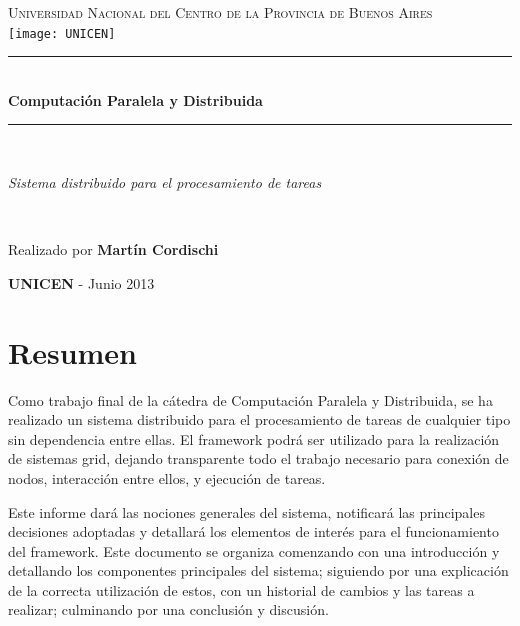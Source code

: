 \documentclass[12pt,a4paper,oneside,spanish]{report}
\newcommand{\HRule}{\rule{\linewidth}{0.5mm}}
\begin{document}
\begin{titlepage}
\begin{center}



\textsc{\LARGE Universidad Nacional del Centro de la Provincia de Buenos Aires}\\[1.5cm]

\texttt{[image: UNICEN]}~\\[1cm]

\HRule \\[0.4cm]
{ \huge \bfseries Computación Paralela y Distribuida}\\[0.4cm]

\HRule \\[0.4cm]


\begin{center}
\textit{Sistema distribuido para el procesamiento de tareas}
\end{center}
~\\[1.5cm]

\begin{center}
Realizado por \textbf{Martín Cordischi}
\end{center}


\textit{} \textbf{} 

\vfill

{\large \textbf{UNICEN} - Junio 2013}

\end{center}
\end{titlepage}

\chapter*{Resumen}

Como trabajo final de la cátedra de Computación Paralela y Distribuida, se ha realizado un sistema distribuido para el procesamiento de tareas de cualquier tipo sin dependencia entre ellas. El framework podrá ser utilizado para la realización de sistemas grid, dejando transparente todo el trabajo necesario para conexión de nodos, interacción entre ellos, y ejecución de tareas.

Este informe dará las nociones generales del sistema, notificará las principales decisiones adoptadas y detallará los elementos de interés para el funcionamiento del framework. Este documento se organiza comenzando con una introducción y detallando los componentes principales del sistema; siguiendo por una explicación de la correcta utilización de estos, con un historial de cambios y las tareas a realizar; culminando por una conclusión y discusión.
\end{document}
